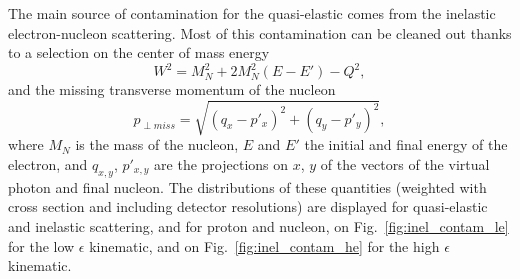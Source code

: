 The main source of contamination for the quasi-elastic comes from the inelastic electron-nucleon scattering. Most of this contamination can be cleaned out thanks to a selection on the center of mass energy
%
\begin{equation}
  W^2 = M_{N}^2+2M_{N}^{2}(E-E')-Q^2, %
\end{equation}
%
and the missing transverse momentum of the nucleon
%
\begin{equation}
  p_{\perp miss} = \sqrt{(q_{x}-p'_{x})^2+(q_{y}-p'_{y})^2},
\end{equation}
%
where $M_N$ is the mass of the nucleon, $E$ and $E'$ the initial and final energy of the electron, and $q_{x,y}$, $p'_{x, y}$ are the projections on $x$, $y$ of the vectors of the virtual photon and final nucleon.
The distributions of these quantities (weighted with cross section and including detector resolutions) are displayed for quasi-elastic and inelastic scattering, and for proton and nucleon, on Fig.~\ref{fig:inel_contam_le} for the low $\epsilon$ kinematic, and on Fig.~\ref{fig:inel_contam_he} for the high $\epsilon$ kinematic.\par
